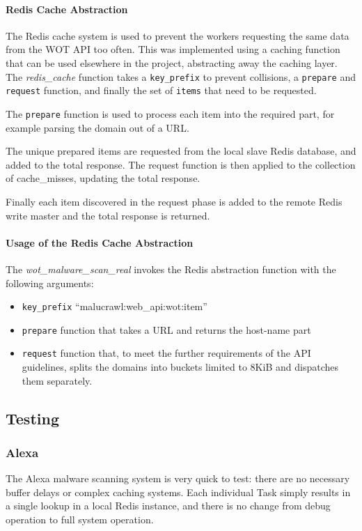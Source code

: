 \paragraph{Redis Cache Abstraction}
The Redis cache system is used to prevent the workers requesting the same data from the WOT API too often.  This was implemented using a caching function that can be used elsewhere in the project, abstracting away the caching layer.  The \emph{redis\_cache} function takes a \verb`key_prefix` to prevent collisions, a \verb`prepare` and \verb`request` function, and finally the set of \verb`items` that need to be requested.

The \verb`prepare` function is used to process each item into the required part, for example parsing the domain out of a URL.

The unique prepared items are requested from the local slave Redis database, and added to the total response. The request function is then applied to the collection of cache\_misses, updating the total response.

Finally each item discovered in the request phase is added to the remote Redis write master and the total response is returned.

\paragraph{Usage of the Redis Cache Abstraction}
The \emph{wot\_malware\_scan\_real} invokes the Redis abstraction function with the following arguments:
\begin{itemize}
    \item \verb`key_prefix` ``malucrawl:web\_api:wot:{item}''
    \item \verb`prepare` function that takes a URL and returns the host-name part
    \item \verb`request` function that, to meet the further requirements of the API guidelines, splits the domains into buckets limited to 8KiB and dispatches them separately.
\end{itemize}

\subsection{Testing}
\subsubsection{Alexa}
The Alexa malware scanning system is very quick to test: there are no necessary buffer delays or complex caching systems. Each individual Task simply results in a single lookup in a local Redis instance, and there is no change from debug operation to full system operation.

